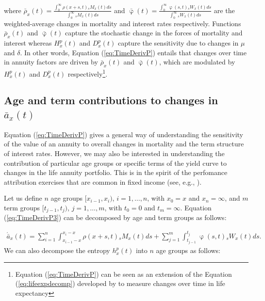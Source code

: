 \documentclass[12pt]{article}
\begin{document}
where $\bar{\rho}_x(t)= \frac{\int_0^\infty \rho(x+s,t) {}_sM_x(t)  ds}{\int_0^\infty  {}_sM_x(t)ds}$ and 
$\bar{\upvarphi}(t)= \frac{\int_0^\infty \upvarphi(s,t) {}_sW_x(t)  ds}{\int_0^\infty {}_sW_x(t) ds}$ are the weighted-average changes in mortality and interest rates respectively. Functions $\bar{\rho}_x(t)$ and $\bar{\upvarphi}(t)$ capture the stochastic change in the forces of mortality and interest whereas ${H}^{p}_x(t)$ and ${D}^{p}_x(t)$ capture the sensitivity due to changes in $\mu$ and $\delta$. In other words, Equation (\ref{eq:TimeDerivP}) entails that changes over time in annuity factors are driven by $\bar{\rho}_x(t)$ and $\bar{\upvarphi}(t)$, which are modulated by ${H}^{p}_x(t)$ and ${D}^{p}_x(t)$ respectively\footnote{Equation (\ref{eq:TimeDerivP}) can be seen as an extension of the Equation (\ref{eq:lifeexpdecomp}) developed by \citet{Vaupel2003} to measure changes over time in life expectancy}.


\subsection{Age and term contributions to changes in $\bar{a}_x(t)$}

Equation (\ref{eq:TimeDerivP}) gives a general way of understanding the sensitivity of the value of an annuity to overall changes in mortality and the term structure of interest rates. However, we may also be interested in understanding the contribution of particular age groups or specific terms of the yield curve to changes in the life annuity portfolio. This is in the spirit of the perfomance attribution exercises that are common in fixed income (see, e.g., \citet{Daul2012}).

 Let us define $n$ age groups $[x_{i-1}, x_i)$, $i=1,\ldots,n$, with $x_0=x$ and $x_n=\infty$, and $m$ term groups $[t_{j-1}, t_j)$, $j=1,\ldots,m$, with $t_0=0$ and $t_m=\infty$. Equation (\ref{eq:TimeDerivP3}) can be decomposed by age and term groups as follows:

\begin{equation}\label{eq:TimeDerivAge}
\begin{split}
 \acute{\bar{a}}_x(t) = \sum_{i=1}^n\int_{x_{i-1}-x}^{x_i-x}  \rho(x+s,t) {}_sM_x(t)  ds +\sum_{j=1}^m\int_{t_{j-1}}^{t_j}   \upvarphi(s,t) {}_sW_x(t)  ds.  
\end{split}
\end{equation}
We can also decompose the entropy $h_x^p(t)$ into $n$ age groups as follows:
\end{document}
